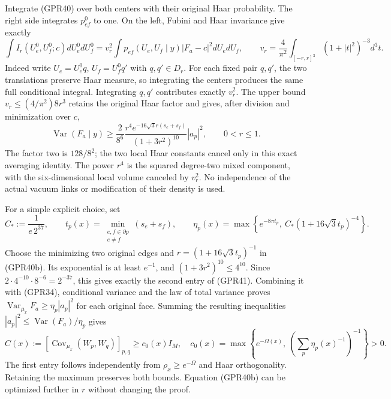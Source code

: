 \documentclass[11pt]{article}
\begin{document}
Integrate (GPR40) over both centers with their original Haar probability. The right side integrates \(p_{ef}^0\) to one. On the left, Fubini and Haar invariance give exactly
\[
 \int I_r(U_e^0,U_f^0;c)dU_e^0dU_f^0
 =v_r^2\int p_{ef}(U_e,U_f\mid y)|F_a-c|^2dU_edU_f,
 \qquad
 v_r=\frac4{\pi^2}\int_{[-r,r]^3}(1+|t|^2)^{-3}d^3t.
 \tag{GPR40a}
\]
Indeed write \(U_e=U_e^0q\), \(U_f=U_f^0q'\) with \(q,q'\in D_r\). For each fixed pair \(q,q'\), the two translations preserve Haar measure, so integrating the centers produces the same full conditional integral. Integrating \(q,q'\) contributes exactly \(v_r^2\). The upper bound \(v_r\le(4/\pi^2)8r^3\) retains the original Haar factor and gives, after division and minimization over \(c\),
\[
 \boxed{\operatorname{Var}(F_a\mid y)
 \ge\frac2{8^6}\frac{r^4e^{-16\sqrt3r(s_e+s_f)}}{(1+3r^2)^{10}}|a_p|^2,
 \qquad0<r\le1.}
 \tag{GPR40b}
\]
The factor two is \(128/8^2\); the two local Haar constants cancel only in this exact averaging identity. The power \(r^4\) is the squared degree-two mixed component, with the six-dimensional local volume canceled by \(v_r^2\). No independence of the actual vacuum links or modification of their density is used.

For a simple explicit choice, set
\[
 C_*:=\frac1{e\,2^{37}},\qquad
 t_p(x)=\min_{\substack{e,f\in\partial p\\e\ne f}}(s_e+s_f),\qquad
 \eta_p(x)=\max\left\{e^{-8\pi t_p},\ C_*(1+16\sqrt3t_p)^{-4}\right\}.
 \tag{GPR41}
\]
Choose the minimizing two original edges and \(r=(1+16\sqrt3t_p)^{-1}\) in (GPR40b). Its exponential is at least \(e^{-1}\), and \((1+3r^2)^{10}\le4^{10}\). Since \(2\cdot4^{-10}\cdot8^{-6}=2^{-37}\), this gives exactly the second entry of (GPR41). Combining it with (GPR34), conditional variance and the law of total variance proves \(\operatorname{Var}_{\mu_x}F_a\ge\eta_p|a_p|^2\) for each original face. Summing the resulting inequalities \( |a_p|^2\le\operatorname{Var}(F_a)/\eta_p\) gives
\[
 C(x):=[\operatorname{Cov}_{\mu_x}(W_p,W_q)]_{p,q}\ge c_0(x)I_M,
 \quad
 c_0(x)=\max\left\{e^{-\Omega(x)},\ \left(\sum_p\eta_p(x)^{-1}\right)^{-1}\right\}>0.
 \tag{GPR42}
\]
The first entry follows independently from \(\rho_x\ge e^{-\Omega}\) and Haar orthogonality. Retaining the maximum preserves both bounds. Equation (GPR40b) can be optimized further in \(r\) without changing the proof.
\end{document}
